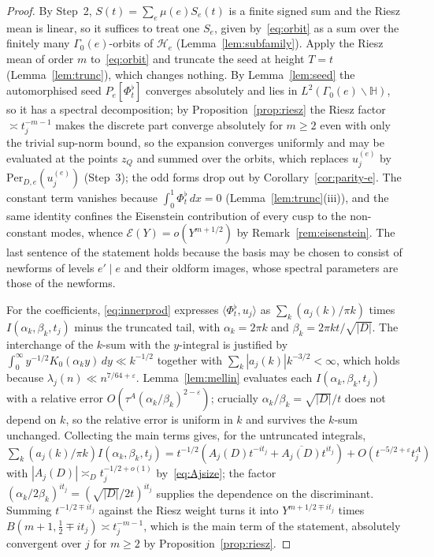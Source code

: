 \documentclass[11pt,a4paper]{article}
\theoremstyle{remark}\newtheorem{remark}[theorem]{Remark}
\begin{document}
\begin{proof}
By Step~2, $S(t)=\sum_e\mu(e)S_e(t)$ is a finite signed sum and the Riesz mean is linear, so it suffices to treat one
$S_e$, given by~\eqref{eq:orbit} as a sum over the finitely many $\Gamma_0(e)$-orbits of $\mathcal H_e$
(Lemma~\ref{lem:subfamily}). Apply the Riesz mean of order $m$ to~\eqref{eq:orbit} and truncate the seed at height
$T=t$ (Lemma~\ref{lem:trunc}), which changes nothing. By Lemma~\ref{lem:seed} the automorphised seed
$P_e[\Phi^\flat_t]$ converges absolutely and lies in $L^2(\Gamma_0(e)\backslash\mathbb H)$, so it has a spectral
decomposition; by Proposition~\ref{prop:riesz} the Riesz factor $\asymp t_j^{-m-1}$ makes the discrete part converge
absolutely for $m\ge2$ even with only the trivial sup-norm bound, so the expansion converges uniformly and may be
evaluated at the points $z_Q$ and summed over the orbits, which replaces $u^{(e)}_j$ by
$\mathrm{Per}_{D,e}(u^{(e)}_j)$ (Step~3); the odd forms drop out by Corollary~\ref{cor:parity-e}. The constant term
vanishes because $\int_0^1\Phi^\flat_t\,dx=0$ (Lemma~\ref{lem:trunc}(iii)), and the same identity confines the
Eisenstein contribution of every cusp to the non-constant modes, whence $\mathcal E(Y)=o(Y^{m+1/2})$ by
Remark~\ref{rem:eisenstein}. The last sentence of the statement holds because the basis may be chosen to consist of
newforms of levels $e'\mid e$ and their oldform images, whose spectral parameters are those of the newforms.

For the coefficients, \eqref{eq:innerprod} expresses $\langle\Phi^\flat_t,u_j\rangle$ as $\sum_k(a_j(k)/\pi k)$
times $I(\alpha_k,\beta_k,t_j)$ minus the truncated tail, with $\alpha_k=2\pi k$ and $\beta_k=2\pi kt/\sqrt{|D|}$.
The interchange of the $k$-sum with the $y$-integral is justified by
$\int_0^\infty y^{-1/2}K_0(\alpha_ky)\,dy\ll k^{-1/2}$ together with $\sum_k|a_j(k)|k^{-3/2}<\infty$, which holds
because $\lambda_j(n)\ll n^{7/64+\varepsilon}$. Lemma~\ref{lem:mellin} evaluates each $I(\alpha_k,\beta_k,t_j)$ with a
relative error $O(\tau^{A}(\alpha_k/\beta_k)^{2-\varepsilon})$; crucially $\alpha_k/\beta_k=\sqrt{|D|}/t$ does not
depend on $k$, so the relative error is uniform in $k$ and survives the $k$-sum unchanged. Collecting the main terms
gives, for the untruncated integrals,
$\sum_k(a_j(k)/\pi k)I(\alpha_k,\beta_k,t_j)=t^{-1/2}(A_j(D)t^{-it_j}+\overline{A_j(D)}t^{it_j})+O(t^{-5/2+\varepsilon}t_j^{A})$
with $|A_j(D)|\asymp_Dt_j^{-1/2+o(1)}$ by~\eqref{eq:Ajsize}; the factor
$(\alpha_k/2\beta_k)^{it_j}=(\sqrt{|D|}/2t)^{it_j}$ supplies the dependence on the discriminant. Summing $t^{-1/2\mp it_j}$
against the Riesz weight turns it into $Y^{m+1/2\mp it_j}$ times $B(m+1,\tfrac12\mp it_j)\asymp t_j^{-m-1}$, which is the
main term of the statement, absolutely convergent over $j$ for $m\ge2$ by Proposition~\ref{prop:riesz}.


\end{proof}
\end{document}
